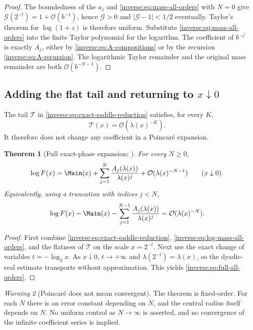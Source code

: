 \documentclass[11pt,oneside]{article}
\newtheorem{theorem}{Theorem}[section]
\theoremstyle{definition}
\theoremstyle{remark}
\newtheorem{warning}[theorem]{Warning}
\newcommand{\bigO}{\mathcal O}
\begin{document}
\begin{proof}
The boundedness of the $a_j$ and \eqref{inverse:eq:mass-all-orders} with $N=0$
give $\mathcal G(2^{-t})=1+\bigO(b^{-1})$, hence
$\mathcal G>0$ and $|\mathcal G-1|<1/2$ eventually.  Taylor's theorem for
$\log(1+z)$ is therefore uniform.  Substitute
\eqref{inverse:eq:mass-all-orders} into the finite Taylor polynomial for the
logarithm.  The coefficient of $b^{-j}$ is exactly $A_j$, either by
\eqref{inverse:eq:A-compositions} or by the recursion
\eqref{inverse:eq:A-recursion}.  The logarithmic Taylor remainder and the
original mass remainder are both $\bigO(b^{-N-1})$.
\end{proof}

\subsection{Adding the flat tail and returning to \texorpdfstring{\(x\downarrow0\)}{x to 0}}

The tail $\mathcal T$ in \eqref{inverse:eq:exact-saddle-reduction} satisfies, for
every $K$,
\[
 \mathcal T(x)=\bigO(\lambda(x)^{-K}).
\]
It therefore does not change any coefficient in a Poincar\'e expansion.

\begin{theorem}[Full exact-phase expansion; \Formalized]
\label{inverse:thm:full-all-orders}
For every $N\geq0$,
\begin{equation}
 \log F(x)
 =\Main(x)+
   \sum_{j=1}^{N}\frac{A_j(\lambda(x))}{\lambda(x)^j}
   +\bigO(\lambda(x)^{-N-1})
 \qquad(x\downarrow0). \label{inverse:eq:full-all-orders}
\end{equation}
Equivalently, using a truncation with indices $j<N$,
\[
 \log F(x)-\Main(x)-
 \sum_{j=1}^{N-1}\frac{A_j(\lambda(x))}{\lambda(x)^j}
 =\bigO(\lambda(x)^{-N}).
\]
\end{theorem}

\begin{proof}
First combine \eqref{inverse:eq:exact-saddle-reduction},
\eqref{inverse:eq:log-mass-all-orders}, and the flatness of $\mathcal T$ on the
scale $x=2^{-t}$.  Next use the exact change of variables
$t=-\log_2x$.  As $x\downarrow0$, $t\to+\infty$ and
$\lambda(2^{-t})=\lambda(x)$, so the dyadic-real estimate transports
without approximation.  This yields \eqref{inverse:eq:full-all-orders}.
\end{proof}

\begin{warning}[Poincar\'e does not mean convergent]
The theorem is fixed-order.  For each $N$ there is an error constant
depending on $N$, and the central radius itself depends on $N$.  No
uniform control as $N\to\infty$ is asserted, and no convergence of the
infinite coefficient series is implied.
\end{warning}
\end{document}
